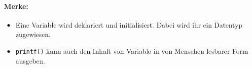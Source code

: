 \paragraph{Merke:}

\begin{itemize}[noitemsep]
    \item Eine Variable wird deklariert und initialisiert. Dabei wird ihr ein Datentyp zugewiesen.
    \item \texttt{printf()} kann auch den Inhalt von Variable in von Menschen lesbarer Form ausgeben.
\end{itemize}
